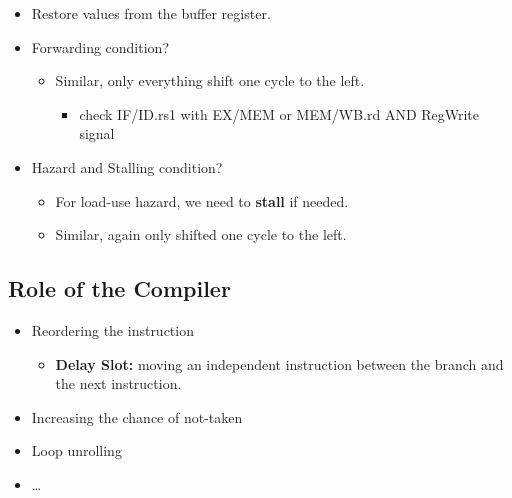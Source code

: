 \documentclass[10pt]{article}
\begin{document}
\begin{itemize}
    \item Restore values from the buffer register.
    \item Forwarding condition?
    \begin{itemize}
        \item Similar, only everything shift one cycle to the left.
        \begin{itemize}
            \item check IF/ID.rs1 with EX/MEM or MEM/WB.rd AND RegWrite signal
        \end{itemize}
    \end{itemize}
    \item Hazard and Stalling condition?
    \begin{itemize}
        \item For load-use hazard, we need to \textbf{stall} if needed.
        \item Similar, again only shifted one cycle to the left.
    \end{itemize}
\end{itemize}

\subsection*{Role of the Compiler}
\begin{itemize}
    \item Reordering the instruction
    \begin{itemize}
        \item \textbf{Delay Slot:} moving an independent instruction between the branch and the next instruction.
    \end{itemize}
    \item Increasing the chance of not-taken
    \item Loop unrolling
    \item \dots
\end{itemize}
\end{document}
